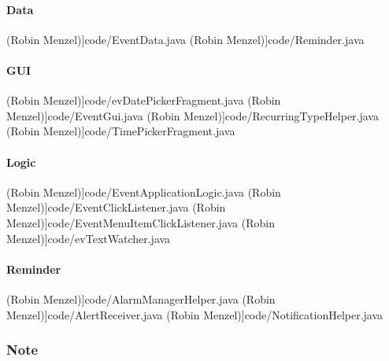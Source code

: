 		\paragraph{Data}
 (Robin Menzel)]{code/EventData.java}
 (Robin Menzel)]{code/Reminder.java}
		\paragraph{GUI}
 (Robin Menzel)]{code/evDatePickerFragment.java}
 (Robin Menzel)]{code/EventGui.java}
 (Robin Menzel)]{code/RecurringTypeHelper.java}
 (Robin Menzel)]{code/TimePickerFragment.java}
		\paragraph{Logic}
 (Robin Menzel)]{code/EventApplicationLogic.java}
 (Robin Menzel)]{code/EventClickListener.java}
 (Robin Menzel)]{code/EventMenuItemClickListener.java}
 (Robin Menzel)]{code/evTextWatcher.java}
		\paragraph{Reminder}
 (Robin Menzel)]{code/AlarmManagerHelper.java}
 (Robin Menzel)]{code/AlertReceiver.java}
 (Robin Menzel)]{code/NotificationHelper.java}
	\subsubsection{Note}
